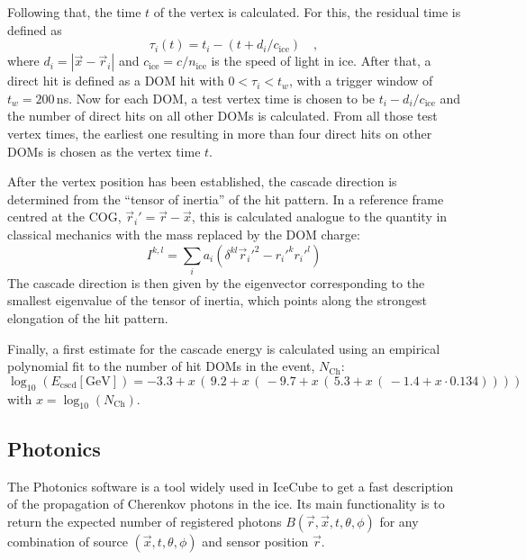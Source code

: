 Following that, the time $t$ of the vertex is calculated. For this, the residual
time is defined as
\begin{equation}
 \tau_i(t) = t_i - \left( t + d_i/c_\mathrm{ice} \right) \quad,
\end{equation}
where $d_i = | \vec{x} - \vec{r}_i |$ and $c_\mathrm{ice} = c/n_\mathrm{ice}$ is
the speed of light in ice. After that, a direct hit is defined as a DOM hit
with $0 < \tau_i < t_w$, with a trigger window of $t_w = 200$\,ns. Now for each
DOM, a test vertex time is chosen to be $t_i - d_i/c_\mathrm{ice}$ and the
number of direct hits on all other DOMs is calculated. From all those test
vertex times, the earliest one resulting in more than four direct hits on other
DOMs is chosen as the vertex time $t$.

After the vertex position has been established, the cascade direction is
determined from the ``tensor of inertia'' of the hit pattern. In a reference
frame centred at the COG, $\vec{r}_i' = \vec{r} - \vec{x}$, this is calculated
analogue to the quantity in classical mechanics with the mass replaced by the
DOM charge:
\begin{equation}
 I^{k,l} = \sum_i a_i \left(\delta^{kl} \vec{r}_i'^2 - r_i'^k r_i'^l\right)
\end{equation}
The cascade direction is then given by the eigenvector corresponding to the
smallest eigenvalue of the tensor of inertia, which points along the strongest
elongation of the hit pattern.

Finally, a first estimate for the cascade energy is calculated using an
empirical polynomial fit \cite{Processing} to the number of hit DOMs in the
event, $N_\mathrm{Ch}$:
\begin{equation}
 \log_{10}\left(E_\mathrm{cscd} [\mathrm{GeV}]\right) =
  -3.3 + x\,(\,9.2 + x\,(\,-9.7 + x\,(\,5.3 + x\,(\,-1.4 + x\cdot 0.134))))
\end{equation}
with $x = \log_{10}(N_\mathrm{Ch})$.

\subsection{Photonics}
\label{sec:reco_photonics}

The Photonics software \cite{Photonics} is a tool widely used in IceCube to get
a fast description of the propagation of Cherenkov photons in the ice. Its main
functionality is to return the expected number of registered photons
$B(\vec{r}, \vec{x}, t, \theta, \phi)$ for any combination of source
$(\vec{x}, t, \theta, \phi)$ and sensor position $\vec{r}$.

